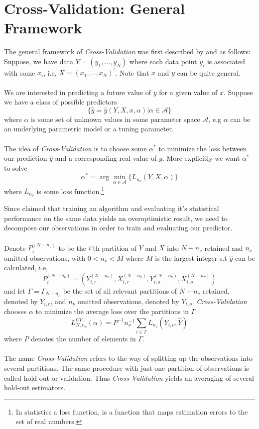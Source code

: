 \documentclass[Research_Module_ES.tex]{subfiles}
\begin{document}
\section{Cross-Validation: General Framework}
The general framework of \textit{Cross-Validation} was first described by \cite{stone1974cross} and  \cite{geisser1975predictive} as follows: \\

Suppose, we have data $Y=(y_1,\ldots,y_N)$ where each data point $y_i$ is associated with some $x_i$, i.e, $X=(x_1,\ldots,x_N)^\prime$. Note that $x$ and $y$ can be quite general.\\
\\
We are interested in predicting a future value of $y$ for a given value of $x$. Suppose we have a class of possible predictors 
\[
	\{\hat{y}=\hat{y}(Y,X,x,\alpha)|\alpha\in\mathscr{A}\}
\]
where $\alpha$ is some set of unknown values in some parameter space $\mathscr{A}$, e.g $\alpha$ can be an underlying parametric model or a tuning parameter.\\
\\
The idea of \textit{Cross-Validation} is to choose some $\alpha^\ast$ to minimize the loss between our prediction $\hat{y}$ and a corresponding real value of $y$. More explicitly we want $\alpha^\ast$ to solve
\[
	\alpha^\ast=\arg\min_{\alpha\in\mathscr{A}}\{L_{n_\nu}(Y,X,\alpha)\}
\]
where $L_{n_\nu}$ is some loss function.\footnote{In statistics a loss function, is a function that maps estimation errors to the set of real numbers.  }
 
Since \cite{larson1931shrinkage} claimed that training an algorithm and evaluating it's statistical performance on the same data yields an overoptimistic result, we need to decompose our observations in order to train and evaluating our predictor. \\
\\
Denote $P^{(N-n_\nu)}_i$ to be the $i$'th partition of $Y$ and $X$ into $N-n_\nu$ retained and $n_\nu$ omitted observations, with $0<n_\nu<M$ where $M$ is the largest integer s.t $\hat{y}$ can be calculated, i.e,
\[
	P^{(N-n_\nu)}_i=(Y_{i,r}^{(N-n_\nu)},X_{i,r}^{(N-n_\nu)},Y_{i,o}^{(N-n_\nu)},X_{i,o}^{(N-n_\nu)})
\]
and let $\Gamma=\Gamma_{N-n_\nu}$ be the set of all relevant partitions of $N-n_\nu$ retained, denoted by $Y_{i,r}$, and $n_\nu$ omitted observations, denoted by $Y_{i,o}$. \textit{Cross-Validation} chooses $\alpha$ to minimize the average loss over the partitions in $\Gamma$ 
\[
	L_{N,n_\nu}^{CV}(\alpha)=P^{-1}n_\nu^{-1}\sum_{i\in\Gamma}L_{n_\nu}(Y_{i,o},\hat{Y})
\]
where $P$ denotes the number of elements in $\Gamma$.\\
\\
The name \textit{Cross-Validation} refers to the way of splitting up the observations into several partitions. The same procedure with just one partition of observations is called hold-out or validation. Thus \textit{Cross-Validation} yields an averaging of several hold-out estimators.
\end{document}
